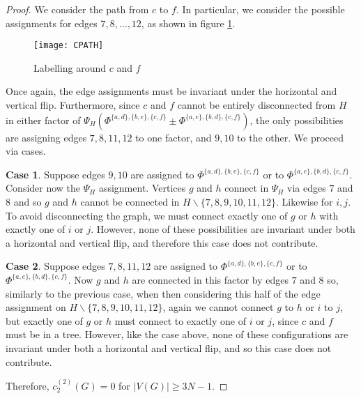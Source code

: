 \documentclass[12pt]{amsart}
\numberwithin{definition}{section}
\begin{document}
\begin{proof}
	We consider the path from $c$ to $f$. In particular, we consider the possible assignments for edges $7,8,\dots,12$, as shown in figure \ref{fig spine}.
        
	\begin{figure}[h]
		\texttt{[image: CPATH]} 
		\caption{Labelling around $c$ and $f$}\label{fig spine} 
	\end{figure}
        
	Once again, the edge assignments must be invariant under the horizontal and vertical flip. Furthermore, since $c$ and $f$ cannot be entirely disconnected from $H$ in either factor of $\Psi_H(\Phi^{\{a,d\},\{b,e\},\{c,f\}}\pm\Phi^{\{a,e\},\{b,d\},\{c,f\}})$, the only possibilities are assigning edges $7,8,11,12$ to one factor, and $9,10$ to the other. We proceed via cases.

\medskip
	
	\noindent\textbf{Case 1}. Suppose edges $9,10$ are assigned to $\Phi^{\{a,d\},\{b,e\},\{c,f\}}$ or to $ \Phi^{\{a,e\},\{b,d\},\{c,f\}}$. Consider now the $\Psi_H$ assignment.  Vertices $g$ and $h$ connect in $\Psi_H$ via edges $7$ and $8$ and so $g$ and $h$ cannot be connected in $H\backslash\{7,8,9,10,11,12\}$.  Likewise for $i,j$. To avoid disconnecting the graph, we must connect exactly one of $g$ or $h$ with exactly one of $i$ or $j$. However, none of these possibilities are invariant under both a horizontal and vertical flip, and therefore this case does not contribute. 

\medskip
	
	\noindent\textbf{Case 2}. Suppose edges $7,8,11,12$ are assigned to $\Phi^{\{a,d\},\{b,e\},\{c,f\}}$ or to $ \Phi^{\{a,e\},\{b,d\},\{c,f\}}$.  Now $g$ and $h$ are connected in this factor by edges $7$ and $8$ so, similarly to the previous case, when then considering this half of the edge assignment on $H\backslash\{7,8,9,10,11,12\}$, again we cannot connect $g$ to $h$ or $i$ to $j$, but exactly one of $g$ or $h$ must connect to exactly one of $i$ or $j$, since $c$ and $f$ must be in a tree. However, like the case above, none of these configurations are invariant under both a horizontal and vertical flip, and so this case does not contribute. 

\medskip
	
	Therefore, $c_2^{(2)}(G)=0$ for $|V(G)| \geq 3N-1$. 
\end{proof}
\end{document}
